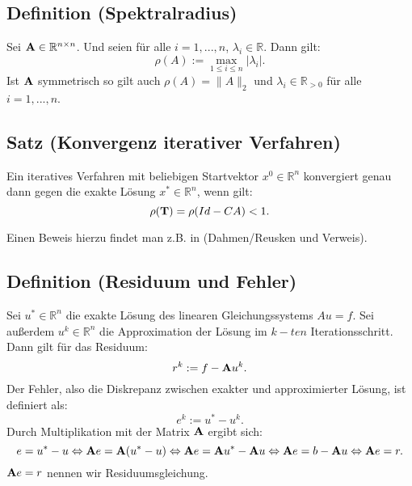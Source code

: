 \subsection{Definition (Spektralradius)}\label{s.Spektralradius}

Sei ${\textbf{A}} \in \mathbb{R}^{n \times n}$. Und seien für alle $i=1,...,n$, $\lambda_{i} \in \mathbb{R}$. Dann gilt:
\begin{equation}
\rho(A) := \max_{1 \le i \le n} | \lambda_{i} |.
\end{equation}
Ist ${\textbf{A}}$ symmetrisch so gilt auch $\rho(A) = \| A \|_{2}$ und $\lambda_{i} \in \mathbb{R}_{>0}$ für alle $i=1,...,n$.

\subsection{Satz (Konvergenz iterativer Verfahren)}\label{ss.Konvergenz iterativer Verfahren}

Ein iteratives Verfahren mit beliebigen Startvektor $x^{0} \in \mathbb{R}^{n}$ konvergiert genau dann gegen die exakte Lösung $x^{*} \in \mathbb{R}^{n}$, wenn gilt:
\begin{equation}
\rho({\textbf{T}}) = \rho(Id - CA) < 1.
\end{equation}

Einen Beweis hierzu findet man z.B. in (Dahmen/Reusken und Verweis).

\subsection{Definition (Residuum und Fehler)}\label{ss.Residuum und Fehler}

Sei $u^{*} \in \mathbb{R}^{n}$ die exakte Lösung des linearen Gleichungssystems $Au = f$. Sei außerdem $u^{k} \in \mathbb{R}^{n}$ die Approximation der Lösung im $k-ten$ Iterationsschritt. Dann gilt für das Residuum:
\begin{equation}
r^{k} := f - {\textbf{A}} u^{k}.\label{eq.Residuum}
\end{equation}
Der Fehler, also die Diskrepanz zwischen exakter und approximierter Lösung, ist definiert als:
\begin{equation}
e^{k} := u^{*} - u^{k}.\label{eq.Fehler}
\end{equation}
Durch Multiplikation mit der Matrix ${\textbf{A}}$ ergibt sich:
\begin{equation}
e = u^{*} - u \Leftrightarrow {\textbf{A}}e = {\textbf{A}}(u^{*} - u) \Leftrightarrow {\textbf{A}}e = {\textbf{A}} u^{*} - {\textbf{A}} u \Leftrightarrow {\textbf{A}}e = b - {\textbf{A}} u \Leftrightarrow {\textbf{A}}e = r.\label{eq.Residuumsgleichung}
\end{equation}
${\textbf{A}}e = r$ nennen wir Residuumsgleichung.

